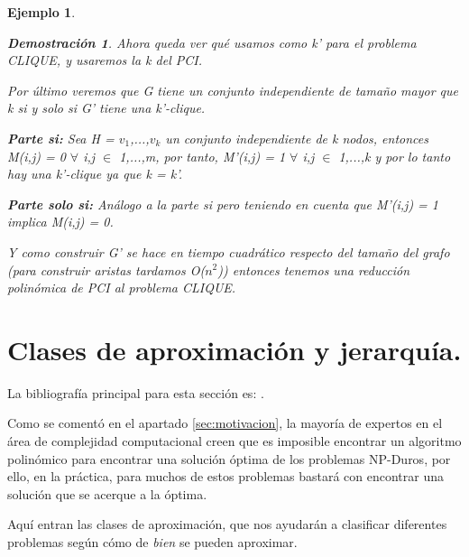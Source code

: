 \documentclass[a4paper,12pt,titlepage]{article}
\newtheorem{eje}{Ejemplo}[section]
\newtheorem*{dem}{\textbf{Demostraci\'on}}
\begin{document}
\begin{eje}
\begin{dem}
\vspace{\baselineskip}

Ahora queda ver qu\'e usamos como k' para el problema CLIQUE, y usaremos la k del PCI.

Por \'ultimo veremos que G tiene un conjunto independiente de tamaño mayor que k  si y solo si G' tiene una k'-clique.

\vspace{\baselineskip}

\textbf{Parte si:} Sea H = {$v_1$,...,$v_k$} un conjunto independiente de k nodos, entonces M(i,j) = 0 $\forall$ i,j $\in$ {1,...,m}, por tanto, M'(i,j) = 1 $\forall$ i,j $\in$ {1,...,k} y por lo tanto hay una k'-clique ya que k = k'.

\vspace{\baselineskip}

\textbf{Parte solo si:} An\'alogo a la parte si pero teniendo en cuenta que M'(i,j) = 1 implica M(i,j) = 0.

\vspace{\baselineskip}

Y como construir G' se hace en tiempo cuadr\'atico respecto del tamaño del grafo (para construir aristas tardamos O($n^2$)) entonces tenemos una reducci\'on polin\'omica de PCI al problema CLIQUE.

\end{dem}

\end{eje}

\newpage

\section{Clases de aproximaci\'on y jerarqu\'ia.}
\label{sec:clases}

La bibliograf\'ia principal para esta secci\'on es: \cite{approx_core}. 

\vspace{0.3cm}

Como se coment\'o en el apartado \ref{sec:motivacion}, la mayor\'ia de expertos en el \'area de complejidad computacional creen que es imposible encontrar un algoritmo polin\'omico para encontrar una soluci\'on \'optima de los problemas NP-Duros, por ello, en la pr\'actica, para muchos de estos problemas bastar\'a con encontrar una soluci\'on que se acerque a la \'optima.

Aqu\'i entran las clases de aproximaci\'on, que nos ayudar\'an a clasificar diferentes problemas seg\'un c\'omo de \textit{bien} se pueden aproximar.
\end{document}
